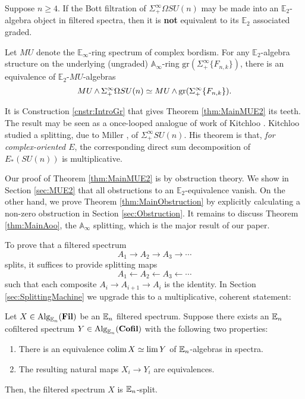 \begin{thm} \label{thm:MainObstruction}
Suppose $n \ge 4$.  If the Bott filtration of $\Sigma^{\infty}_+ \Omega SU(n)$ may be made into an $\mathbb{E}_2$-algebra object in filtered spectra, then it is \textbf{not} equivalent to its $\mathbb{E}_2$ associated graded.
\end{thm}

\begin{thm} \label{thm:MainMUE2}
Let $MU$ denote the $\mathbb{E}_\infty$-ring spectrum of complex bordism.  For any $\mathbb{E}_2$-algebra structure on the underlying (ungraded) $\mathbb{A}_\infty$-ring $\text{gr}(\Sigma^{\infty}_+\{F_{n,k}\})$, there is an equivalence of $\mathbb{E}_2$-$MU$-algebras
$$MU \operatorname{\wedge} \Sigma^{\infty}_+ \Omega SU(n) \simeq MU \operatorname{\wedge} \text{gr}(\Sigma^{\infty}_+\{F_{n,k}\}).$$
\end{thm}

\begin{rmk}
It is Construction \ref{cnstr:IntroGr} that gives Theorem \ref{thm:MainMUE2} its teeth.  The result may be seen as a once-looped analogue of work of Kitchloo \cite{Kitchloo}.   Kitchloo studied a splitting, due to Miller \cite{MillerSplitting}, of $\Sigma^{\infty}_+ SU(n)$.  His theorem is that, \textit{for complex-oriented $E$}, the corresponding direct sum decomposition of $E_*(SU(n))$ is multiplicative.
\end{rmk}

Our proof of Theorem \ref{thm:MainMUE2} is by obstruction theory.  We show in Section \ref{sec:MUE2} that all obstructions to an $\mathbb{E}_2$-equivalence vanish.  On the other hand, we prove Theorem \ref{thm:MainObstruction} by explicitly calculating a non-zero obstruction in Section \ref{sec:Obstruction}.  It remains to discuss Theorem \ref{thm:MainAoo}, the $\mathbb{A}_\infty$ splitting, which is the major result of our paper.

To prove that a filtered spectrum
$$A_1 \longrightarrow A_2 \longrightarrow A_3 \longrightarrow \cdots$$
splits, it suffices to provide splitting maps
$$A_1 \longleftarrow A_2 \longleftarrow A_3 \longleftarrow \cdots$$
such that each composite $A_i \rightarrow A_{i+1} \rightarrow A_i$ is the identity.  In Section \ref{sec:SplittingMachine} we upgrade this to a multiplicative, coherent statement:

\begin{thm}
Let $X\in \operatorname{\text{Alg}}_{\operatorname{\mathbb{E}}_n}(\operatorname{\textbf{Fil}})$ be an $\operatorname{\mathbb{E}}_n$ filtered spectrum.  Suppose there exists an $\operatorname{\mathbb{E}}_n$ cofiltered spectrum $Y\in \operatorname{\text{Alg}}_{\operatorname{\mathbb{E}}_n}(\operatorname{\textbf{Cofil}})$ with the following two properties:
\begin{enumerate}
\item There is an equivalence $\operatorname*{\text{colim}} X \simeq \lim Y$ of $\operatorname{\mathbb{E}}_n$-algebras in spectra.
\item The resulting natural maps $X_i \to Y_i$ are equivalences.  
\end{enumerate}
Then, the filtered spectrum $X$ is $\operatorname{\mathbb{E}}_n$-split.
\end{thm}


